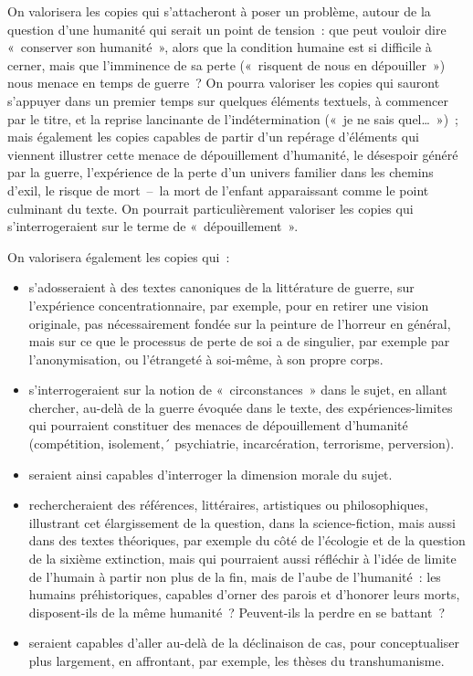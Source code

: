 		{On valorisera les copies qui s'attacheront à poser un problème, autour de la question
d'une humanité qui serait un point de tension~: que peut vouloir dire «~conserver son
humanité~», alors que la condition humaine est si difficile à cerner, mais que l'imminence
de sa perte («~risquent de nous en dépouiller~») nous menace en temps de guerre~?
On pourra valoriser les copies qui sauront s'appuyer dans un premier temps sur
quelques éléments textuels, à commencer par le titre, et la reprise lancinante de
l'indétermination («~je ne sais quel…~»)~; mais également les copies capables de partir
d'un repérage d'éléments qui viennent illustrer cette menace de dépouillement
d'humanité, le désespoir généré par la guerre, l'expérience de la perte d'un univers
familier dans les chemins d'exil, le risque de mort~–~la mort de l'enfant apparaissant
comme le point culminant du texte.
On pourrait particulièrement valoriser les copies qui s'interrogeraient sur le terme de
«~dépouillement~».

On valorisera également les copies qui~:

\begin{itemize}
\item s'adosseraient à des textes canoniques de la littérature de guerre, sur l'expérience
concentrationnaire, par exemple, pour en retirer une vision originale, pas
nécessairement fondée sur la peinture de l'horreur en général, mais sur ce que le
processus de perte de soi a de singulier, par exemple par l'anonymisation, ou
l'étrangeté à soi-même, à son propre corps.

\item s'interrogeraient sur la notion de «~circonstances~» dans le sujet, en allant chercher, au-delà
de la guerre évoquée dans le texte, des expériences-limites qui pourraient
constituer des menaces de dépouillement d'humanité (compétition, isolement,´
psychiatrie, incarcération, terrorisme, perversion).

\item seraient ainsi capables d'interroger la dimension morale du sujet.
\item rechercheraient des références, littéraires, artistiques ou philosophiques, illustrant cet
élargissement de la question, dans la science-fiction, mais aussi dans des textes
théoriques, par exemple du côté de l'écologie et de la question de la sixième extinction,
mais qui pourraient aussi réfléchir à l'idée de limite de l'humain à partir non plus de la
fin, mais de l'aube de l'humanité~: les humains préhistoriques, capables d'orner des
parois et d'honorer leurs morts, disposent-ils de la même humanité~? Peuvent-ils la
perdre en se battant~?

\item seraient capables d'aller au-delà de la déclinaison de cas, pour conceptualiser plus
largement, en affrontant, par exemple, les thèses du transhumanisme.
\end{itemize}}%

